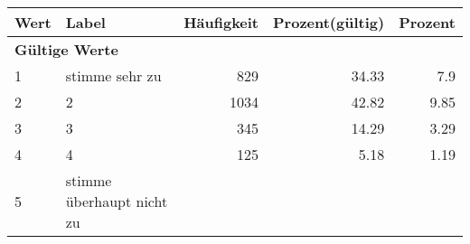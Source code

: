      \begin{longtable}{lXrrr}
     \toprule
     \textbf{Wert} & \textbf{Label} & \textbf{Häufigkeit} & \textbf{Prozent(gültig)} & \textbf{Prozent} \\
     \endhead
     \midrule
     \multicolumn{5}{l}{\textbf{Gültige Werte}}\\

     1 &
     \multicolumn{1}{X}{ stimme sehr zu   } &


       \num{829} &
       \num[round-mode=places,round-precision=2]{34.33} &
         \num[round-mode=places,round-precision=2]{7.9} \\

     2 &
     \multicolumn{1}{X}{ 2   } &


       \num{1034} &
       \num[round-mode=places,round-precision=2]{42.82} &
         \num[round-mode=places,round-precision=2]{9.85} \\

     3 &
     \multicolumn{1}{X}{ 3   } &


       \num{345} &
       \num[round-mode=places,round-precision=2]{14.29} &
         \num[round-mode=places,round-precision=2]{3.29} \\

     4 &
     \multicolumn{1}{X}{ 4   } &


       \num{125} &
       \num[round-mode=places,round-precision=2]{5.18} &
         \num[round-mode=places,round-precision=2]{1.19} \\

     5 &
     \multicolumn{1}{X}{ stimme überhaupt nicht zu   } &



\end{longtable}
